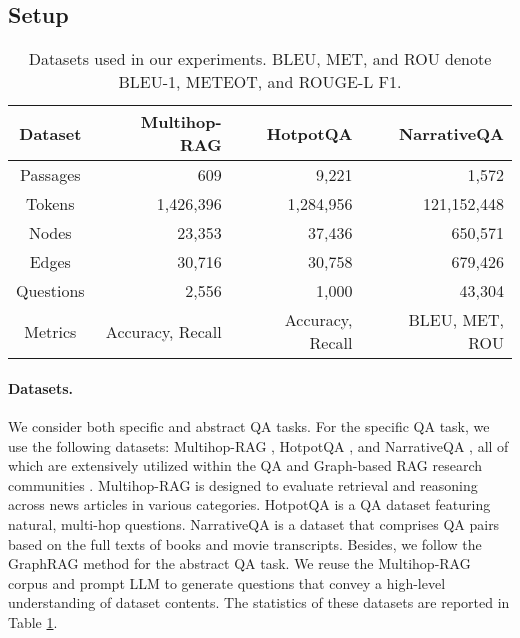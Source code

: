 \subsection{Setup}

\begin{table}[h]
    \centering
    \small
\caption{Datasets used in our experiments. BLEU, MET, and ROU denote BLEU-1, METEOT, and ROUGE-L F1.
}
    \begin{tabular}{c|rrr}
        \toprule
        Dataset & Multihop-RAG & HotpotQA & NarrativeQA  \\
        \midrule
        Passages & 609 & 9,221 & 1,572 \\
        Tokens & 1,426,396  & 1,284,956 & 121,152,448 \\
        Nodes & 23,353 & 37,436 & 650,571  \\
        Edges & 30,716 & 30,758 & 679,426 \\
        Questions & 2,556  & 1,000 & 43,304  \\
        Metrics & Accuracy, Recall & Accuracy, Recall & BLEU, MET, ROU \\
        \bottomrule
    \end{tabular}
    \label{tab:dataset}
\end{table}

\paragraph{Datasets.}
We consider both specific and abstract QA tasks.
% 
For the specific QA task, we use the following datasets:
Multihop-RAG \cite{tang2024multihop}, HotpotQA \cite{yang2018hotpotqa}, and NarrativeQA \cite{kovcisky2018narrativeqa},
all of which are extensively utilized within the QA and Graph-based RAG research communities \cite{hu2022empowering,gutierrez2024hipporag,yao2022react,xu2024unsupervised,sarthi2024raptor,asai2023self}.
Multihop-RAG is designed to evaluate retrieval and reasoning across news articles in various categories.
% 
HotpotQA is a QA dataset featuring natural, multi-hop questions.
% 
NarrativeQA is a dataset that comprises QA pairs based on the full texts of books and movie transcripts.
% 
Besides, we follow the GraphRAG \cite{edge2024local} method for the abstract QA task. 
% 
We reuse the Multihop-RAG corpus and prompt LLM to generate questions that convey a high-level understanding of dataset contents.
% 
The statistics of these datasets are reported in Table \ref{tab:dataset}.
% 



